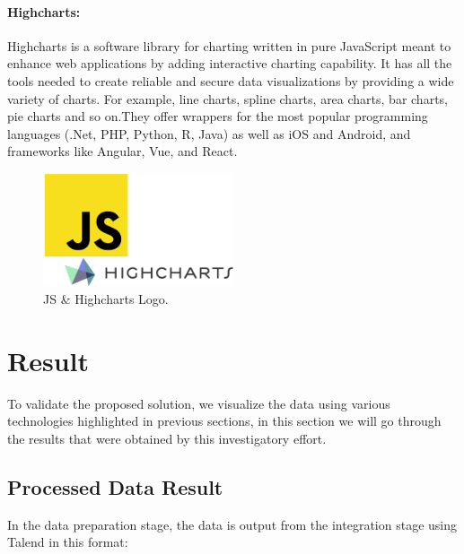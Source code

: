 \paragraph*{Highcharts:}
Highcharts is a software library for charting written in pure JavaScript meant to enhance web applications by adding interactive charting capability. 
It has all the tools needed to create reliable and secure data visualizations by
providing a wide variety of charts. For example, line charts, spline charts, area charts, bar charts, pie charts and so on.They offer wrappers for the most popular programming languages (.Net, PHP, Python, R, Java) as well as iOS and Android, and frameworks like Angular, Vue, and React\cite{InteractiveJavascriptCharts}. 
\begin{figure}[h!]
    \center
    \includegraphics[width=0.50\textwidth]{images/chapter4/jshigh.png}
    \caption{JS \& Highcharts Logo.}
    \label{fig:Highcharts}
\end{figure}

\section{Result}
To validate the proposed solution, we visualize the data  using various technologies highlighted in previous sections, in this section we will go through the results that were obtained by this investigatory effort.
\subsection{Processed Data Result}
In the data preparation stage, the data is output from the integration stage using Talend in this format:


